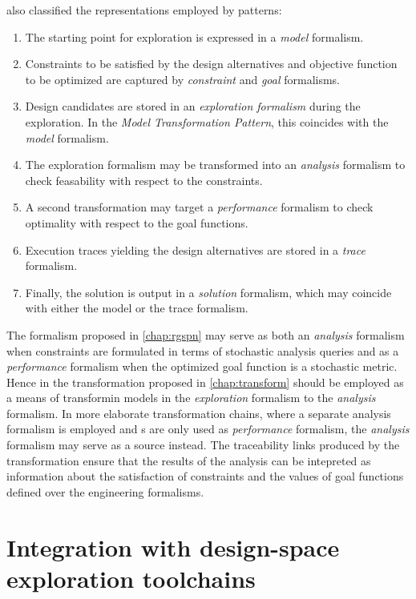 \citet{Vanherpen14patterns} also classified the representations employed by  patterns:
\begin{enumerate}
\item The starting point for exploration is expressed in a \emph{model} formalism.
\item Constraints to be satisfied by the design alternatives and objective function to be optimized are captured by \emph{constraint} and \emph{goal} formalisms.
\item Design candidates are stored in an \emph{exploration formalism} during the exploration. In the \emph{Model Transformation Pattern}, this coincides with the \emph{model} formalism.
\item The exploration formalism may be transformed into an \emph{analysis} formalism to check feasability with respect to the constraints.
\item A second transformation may target a \emph{performance} formalism to check optimality with respect to the goal functions.
\item Execution traces yielding the design alternatives are stored in a \emph{trace} formalism.
\item Finally, the solution is output in a \emph{solution} formalism, which may coincide with either the model or the trace formalism.
\end{enumerate}

The  formalism proposed in \cref{chap:rgspn} may serve as both an \emph{analysis} formalism when constraints are formulated in terms of stochastic analysis queries and as a \emph{performance} formalism when the optimized goal function is a stochastic metric. Hence in  the transformation proposed in \cref{chap:transform} should be employed as a means of transformin models in the \emph{exploration} formalism to the \emph{analysis} formalism. In more elaborate transformation chains, where a separate analysis formalism is employed and s are only used as \emph{performance} formalism, the \emph{analysis} formalism may serve as a source instead. The traceability links produced by the transformation ensure that the results of the analysis can be intepreted as information about the satisfaction of constraints and the values of goal functions defined over the engineering formalisms.

\citep{Varro17generation}

\todo*{}

\section{Integration with design-space exploration toolchains}

